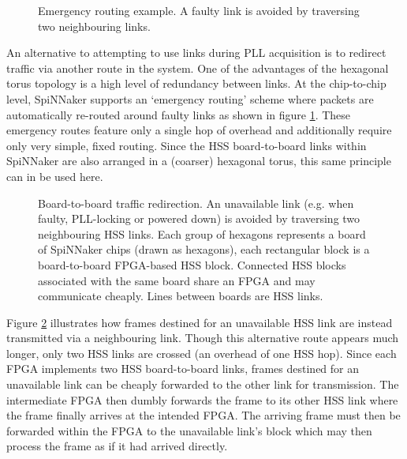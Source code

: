 			\begin{figure}
				\center
				
				
				\caption[Emergency routing example.]{Emergency routing example. A
				faulty link is avoided by traversing two neighbouring links.}
				\label{fig:emergency-routing}
			\end{figure}
			
			An alternative to attempting to use links during PLL acquisition is to
			redirect traffic via another route in the system. One of the advantages of
			the hexagonal torus topology is a high level of redundancy between links.
			At the chip-to-chip level, SpiNNaker supports an `emergency routing'
			scheme where packets are automatically re-routed around faulty links as
			shown in figure \ref{fig:emergency-routing}. These emergency routes
			feature only a single hop of overhead and additionally require only very
			simple, fixed routing. Since the HSS board-to-board links within SpiNNaker
			are also arranged in a (coarser) hexagonal torus, this same principle can
			in be used here.
			
			\begin{figure}
				\center
				
				
				\caption[Board-to-board traffic redirection.]{Board-to-board traffic
				redirection. An unavailable link (e.g. when faulty, PLL-locking or
				powered down) is avoided by traversing two neighbouring HSS links. Each
				group of hexagons represents a board of SpiNNaker chips (drawn as
				hexagons), each rectangular block is a board-to-board FPGA-based HSS
				block. Connected HSS blocks associated with the same board share an FPGA
				and may communicate cheaply. Lines between boards are HSS links.}
				\label{fig:board-to-board-redirection}
			\end{figure}
			
			Figure \ref{fig:board-to-board-redirection} illustrates how frames
			destined for an unavailable HSS link are instead transmitted via a
			neighbouring link.  Though this alternative route appears much longer,
			only two HSS links are crossed (an overhead of one HSS hop). Since each
			FPGA implements two HSS board-to-board links, frames destined for an
			unavailable link can be cheaply forwarded to the other link for
			transmission. The intermediate FPGA then dumbly forwards the frame to its
			other HSS link where the frame finally arrives at the intended FPGA. The
			arriving frame must then be forwarded within the FPGA to the unavailable
			link's block which may then process the frame as if it had arrived
			directly.
			
